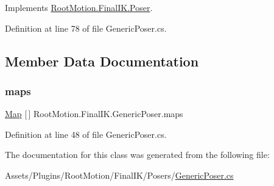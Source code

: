 Implements \mbox{\hyperlink{class_root_motion_1_1_final_i_k_1_1_poser_ab5636eab097e6dbd2c7f3819c8508918}{Root\+Motion.\+Final\+I\+K.\+Poser}}.



Definition at line 78 of file Generic\+Poser.\+cs.



\subsection{Member Data Documentation}
\mbox{\label{class_root_motion_1_1_final_i_k_1_1_generic_poser_ae79ccd649b6ef7c80581384e9d725dee}} 
\subsubsection{\texorpdfstring{maps}{maps}}
{\footnotesize\ttfamily \mbox{\hyperlink{class_root_motion_1_1_final_i_k_1_1_generic_poser_1_1_map}{Map}} \mbox{[}$\,$\mbox{]} Root\+Motion.\+Final\+I\+K.\+Generic\+Poser.\+maps}



Definition at line 48 of file Generic\+Poser.\+cs.



The documentation for this class was generated from the following file\+:\begin{DoxyCompactItemize}
\item 
Assets/\+Plugins/\+Root\+Motion/\+Final\+I\+K/\+Posers/\mbox{\hyperlink{_generic_poser_8cs}{Generic\+Poser.\+cs}}\end{DoxyCompactItemize}
